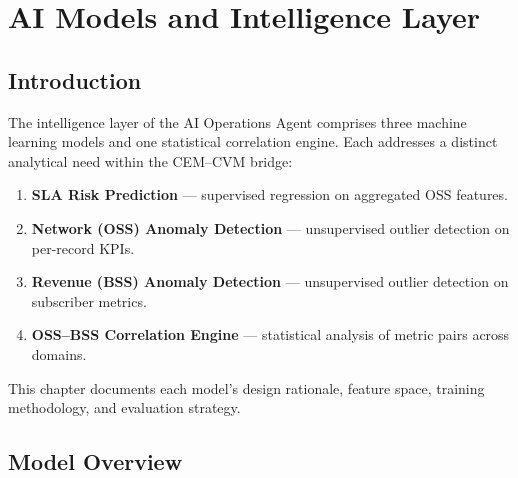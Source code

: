 \chapter{AI Models and Intelligence Layer}
\label{ch:ai}

\section{Introduction}

The intelligence layer of the AI Operations Agent comprises three machine learning models and one statistical correlation engine. Each addresses a distinct analytical need within the CEM--CVM bridge:

\begin{enumerate}
  \item \textbf{SLA Risk Prediction} --- supervised regression on aggregated OSS features.
  \item \textbf{Network (OSS) Anomaly Detection} --- unsupervised outlier detection on per-record KPIs.
  \item \textbf{Revenue (BSS) Anomaly Detection} --- unsupervised outlier detection on subscriber metrics.
  \item \textbf{OSS--BSS Correlation Engine} --- statistical analysis of metric pairs across domains.
\end{enumerate}

This chapter documents each model's design rationale, feature space, training methodology, and evaluation strategy.

\section{Model Overview}

